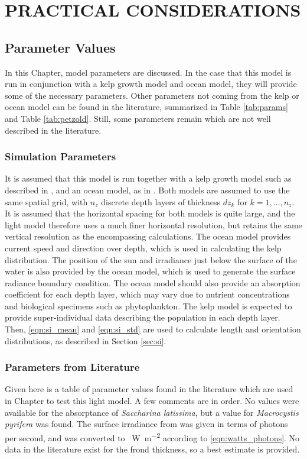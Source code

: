 \chapter{PRACTICAL CONSIDERATIONS}
\label{chap:application}

\section{Parameter Values}
\label{sec:parameters}
In this Chapter, model parameters are discussed.
In the case that this model is run in conjunction with a kelp growth model and ocean model,
they will provide some of the necessary parameters.
Other parameters not coming from the kelp or ocean model can be found in the literature,
summarized in Table \ref{tab:params} and Table \ref{tab:petzold}.
Still, some parameters remain which are not well described in the literature.

\subsection{Simulation Parameters}
It is assumed that this model is run together with a kelp growth model such as described in \citep{broch_modelling_2012}, and an ocean model, as in \citep{wassmann_modelling_2006}.
Both models are assumed to use the same spatial grid, with $n_z$ discrete depth layers of thickness $dz_k$ for $k=1,\ldots,n_z$.
It is assumed that the horizontal spacing for both models is quite large, and the light model therefore uses a much finer horizontal resolution,
but retains the same vertical resolution as the encompassing calculations.
The ocean model provides current speed and direction over depth, which is used in calculating the kelp distribution.
The position of the sun and irradiance just below the surface of the water is also provided by the ocean model, which is used to generate the surface radiance boundary condition.
The ocean model should also provide an absorption coefficient for each depth layer, which may vary due to nutrient concentrations and biological specimens such as phytoplankton.
The kelp model is expected to provide super-individual data describing the population in each depth layer.
Then, \eqref{eqn:si_mean} and \eqref{eqn:si_std} are used to calculate length and orientation distributions, as described in Section \ref{sec:si}.

\subsection{Parameters from Literature}
Given here is a table of parameter values found in the literature which are used in Chapter \Rom{\ref{chap:model_analysis}} to test this light model.
A few comments are in order.
No values were available for the absorptance of \textit{Saccharina latissima}, but a value for \textit{Macrocystis pyrifera} was found.
The surface irradiance from \cite{broch_modelling_2012} was given in terms of photons per second,
and was converted to \SI{}{\W\per\m\squared} according to \eqref{eqn:watts_photons}.
No data in the literature exist for the frond thickness, so a best estimate is provided.

